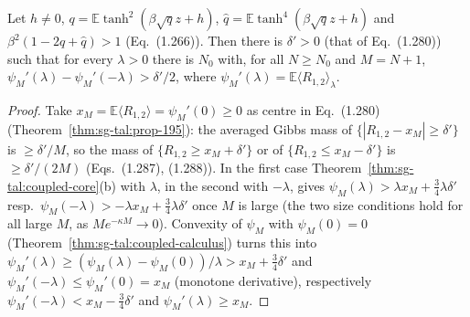 \begin{theorem}
\label{thm:sg-tal:prop-197}
  \leanok
{}
Let $h\ne0$, $q=\mathbb E\tanh^2(\beta\sqrt qz+h)$, $\hat q=\mathbb E\tanh^4(\beta\sqrt qz+h)$ and $\beta^2(1-2q+\hat q)>1$ (Eq.~(1.266)).
Then there is $\delta'>0$ (that of Eq.~(1.280)) such that for every $\lambda>0$ there is $N_0$ with, for all $N\ge N_0$ and $M=N+1$,
$\psi_M'(\lambda)-\psi_M'(-\lambda)>\delta'/2$, where $\psi_M'(\lambda)=\mathbb E\langle R_{1,2}\rangle_\lambda$.
\end{theorem}
\begin{proof}
  \leanok
Take $x_M=\mathbb E\langle R_{1,2}\rangle=\psi_M'(0)\ge0$ as centre in Eq.~(1.280) (Theorem~\ref{thm:sg-tal:prop-195}): the averaged Gibbs mass of
$\{|R_{1,2}-x_M|\ge\delta'\}$ is $\ge\delta'/M$, so the mass of $\{R_{1,2}\ge x_M+\delta'\}$ or of $\{R_{1,2}\le x_M-\delta'\}$ is $\ge\delta'/(2M)$
(Eqs.~(1.287), (1.288)).  In the first case Theorem~\ref{thm:sg-tal:coupled-core}(b) with $\lambda$, in the second with $-\lambda$, gives
$\psi_M(\lambda)>\lambda x_M+\tfrac34\lambda\delta'$ resp.\ $\psi_M(-\lambda)>-\lambda x_M+\tfrac34\lambda\delta'$ once $M$ is large (the two size
conditions hold for all large $M$, as $Me^{-\kappa M}\to0$).  Convexity of $\psi_M$ with $\psi_M(0)=0$
(Theorem~\ref{thm:sg-tal:coupled-calculus}) turns this into $\psi_M'(\lambda)\ge(\psi_M(\lambda)-\psi_M(0))/\lambda>x_M+\tfrac34\delta'$ and
$\psi_M'(-\lambda)\le\psi_M'(0)=x_M$ (monotone derivative), respectively $\psi_M'(-\lambda)<x_M-\tfrac34\delta'$ and $\psi_M'(\lambda)\ge x_M$.
\end{proof}

